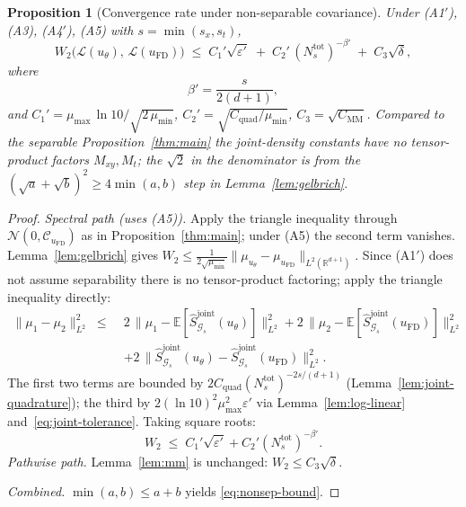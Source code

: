 \documentclass[review,12pt]{elsarticle}
\newtheorem{proposition}{Proposition}
\begin{document}
\begin{proposition}[Convergence rate under non-separable covariance]
\label{thm:nonsep}
Under (A1$'$), (A3), (A4$'$), (A5) with \(s = \min(s_x, s_t)\),
\begin{equation}
\label{eq:nonsep-bound}
W_2\bigl(\mathcal L(u_\theta),\,\mathcal L(u_{\mathrm{FD}})\bigr)
\;\le\; C_1'\sqrt{\varepsilon'}
\;+\; C_2'\,(N_s^{\mathrm{tot}})^{-\beta'}
\;+\; C_3\sqrt{\delta},
\end{equation}
where
\[
\beta' = \frac{s}{2(d+1)},
\]
and \(C_1' = \mu_{\max}\,\ln 10 / \sqrt{2\,\mu_{\min}}\),
\(C_2' = \sqrt{C_{\mathrm{quad}}/\mu_{\min}}\),
\(C_3 = \sqrt{C_{\mathrm{MM}}}\).
Compared to the separable Proposition~\ref{thm:main} the joint-density
constants have no tensor-product factors \(M_{xy},M_t\); the
\(\sqrt{2}\) in the denominator is from the
\((\sqrt{a}+\sqrt{b})^2 \ge 4\min(a,b)\) step in
Lemma~\ref{lem:gelbrich}.
\end{proposition}
\begin{proof}
\emph{Spectral path (uses (A5)).} Apply the triangle inequality
through \(\mathcal N(0, \mathcal C_{u_{\mathrm{FD}}})\) as in
Proposition~\ref{thm:main}; under (A5) the second term vanishes.
Lemma~\ref{lem:gelbrich} gives
\(W_2 \le \tfrac{1}{2\sqrt{\mu_{\min}}}
\|\mu_{u_\theta} - \mu_{u_{\mathrm{FD}}}\|_{L^2(\mathbb R^{d+1})}\).
Since (A1$'$) does not assume separability there is no
tensor-product factoring; apply the triangle inequality directly:
\begin{align*}
\|\mu_1 - \mu_2\|^2_{L^2}
\;\le\;&
2\,\bigl\|\mu_1 -
\mathbb E[\widehat S^{\mathrm{joint}}_{\mathcal G_s}(u_\theta)]\bigr\|^2_{L^2}
+ 2\,\bigl\|\mu_2 -
\mathbb E[\widehat S^{\mathrm{joint}}_{\mathcal G_s}(u_{\mathrm{FD}})]\bigr\|^2_{L^2}
\\
&+ 2\,\bigl\|\widehat S^{\mathrm{joint}}_{\mathcal G_s}(u_\theta)
- \widehat S^{\mathrm{joint}}_{\mathcal G_s}(u_{\mathrm{FD}})\bigr\|^2_{L^2}.
\end{align*}
The first two terms are bounded by
\(2C_{\mathrm{quad}}(N_s^{\mathrm{tot}})^{-2s/(d+1)}\)
(Lemma~\ref{lem:joint-quadrature}); the third by
\(2(\ln 10)^2\mu_{\max}^2\varepsilon'\) via
Lemma~\ref{lem:log-linear} and~\eqref{eq:joint-tolerance}. Taking
square roots:
\[
W_2 \;\le\; C_1'\sqrt{\varepsilon'} + C_2'(N_s^{\mathrm{tot}})^{-\beta'}.
\tag{$\star'$}\label{eq:spectral-path-nonsep}
\]
\emph{Pathwise path.} Lemma~\ref{lem:mm} is unchanged:
\(W_2 \le C_3\sqrt\delta\).

\emph{Combined.} \(\min(a,b) \le a + b\) yields \eqref{eq:nonsep-bound}.
\end{proof}
\end{document}
